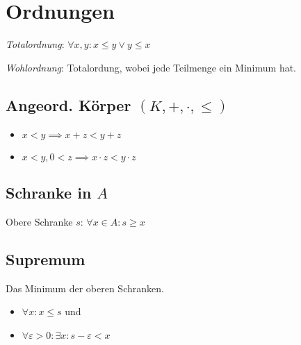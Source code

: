 \section*{Ordnungen}

\textit{Totalordnung}:
$\forall x,y: x \le y \lor y \le x$

\textit{Wohlordnung}:
Totalordung, wobei jede Teilmenge ein Minimum hat.

\subsection*{Angeord. Körper $(K,+,\cdot,\le)$}
\begin{itemize}
	\item $x<y \implies x+z < y+z$
	\item $x<y, 0<z \implies x\cdot z < y \cdot z$
\end{itemize}

\subsection*{Schranke in $A$}
Obere Schranke $s$: $\forall x\in A: s\ge x$

\subsection*{Supremum}
Das Minimum der oberen Schranken.
\begin{itemize}
	\item $\forall x: x \le s$ und
	\item $\forall \varepsilon>0:\exists x: s-\varepsilon<x$
\end{itemize}
